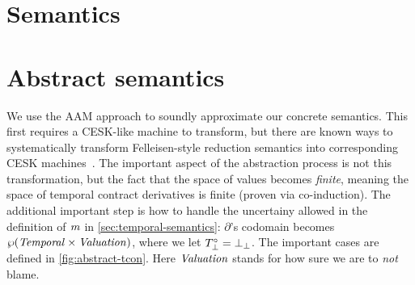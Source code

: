 

\section{Semantics}\label{sec:technical}



\section{Abstract semantics}\label{sec:abstract-semantics}

We use the AAM approach to soundly approximate our concrete semantics.
%
This first requires a CESK-like machine to transform, but there are known ways to systematically transform Felleisen-style reduction semantics into corresponding CESK machines~\citep{dvanhorn:Danvy-Nielsen:RS-04-26}.
%
The important aspect of the abstraction process is not this transformation, but the fact that the space of values becomes \emph{finite}, meaning the space of temporal contract derivatives is finite (proven via co-induction).
%
The additional important step is how to handle the uncertainy allowed in the definition of $\mathit{m}$ in \autoref{sec:temporal-semantics}: $\partial$'s codomain becomes $\wp(\mathit{Temporal} \times \mathit{Valuation})$, where we let $T^\circ_\bot = \bot_\bot$.
%
The important cases are defined in \autoref{fig:abstract-tcon}.
%
Here $\mathit{Valuation}$ stands for how sure we are to \emph{not} blame.
